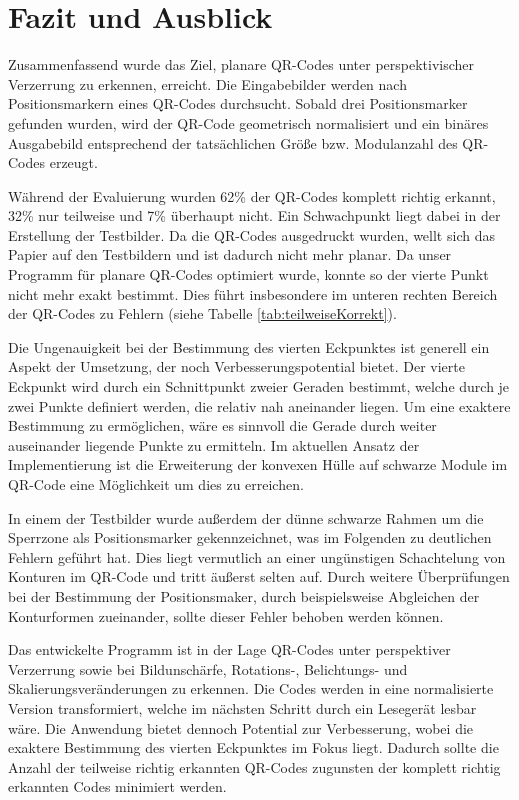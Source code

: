 \documentclass[a4paper, oneside, 12pt]{article}
\begin{document}
\newpage
\section{Fazit und Ausblick}
Zusammenfassend wurde das Ziel, planare QR-Codes unter perspektivischer Verzerrung zu erkennen, erreicht. Die Eingabebilder werden nach Positionsmarkern eines QR-Codes durchsucht. Sobald drei Positionsmarker gefunden wurden, wird der QR-Code geometrisch normalisiert und ein binäres Ausgabebild entsprechend der tatsächlichen Größe bzw. Modulanzahl des QR-Codes erzeugt.

Während der Evaluierung wurden 62\% der QR-Codes komplett richtig erkannt, 32\% nur teilweise und 7\% überhaupt nicht. Ein Schwachpunkt liegt dabei in der Erstellung der Testbilder. Da die QR-Codes ausgedruckt wurden, wellt sich das Papier auf den Testbildern und ist dadurch nicht mehr planar. Da unser Programm für planare QR-Codes optimiert wurde, konnte so der vierte Punkt nicht mehr exakt bestimmt. Dies führt insbesondere im unteren rechten Bereich der QR-Codes zu Fehlern (siehe Tabelle \ref{tab:teilweiseKorrekt}). 

Die Ungenauigkeit bei der Bestimmung des vierten Eckpunktes ist generell ein Aspekt der Umsetzung, der noch Verbesserungspotential bietet. Der vierte Eckpunkt wird durch ein Schnittpunkt zweier Geraden bestimmt, welche durch je zwei Punkte definiert werden, die relativ nah aneinander liegen. Um eine exaktere Bestimmung zu ermöglichen, wäre es sinnvoll die Gerade durch weiter auseinander liegende Punkte zu ermitteln. Im aktuellen Ansatz der Implementierung ist die Erweiterung der konvexen Hülle auf schwarze Module im QR-Code eine Möglichkeit um dies zu erreichen.

In einem der Testbilder wurde außerdem der dünne schwarze Rahmen um die Sperrzone als Positionsmarker gekennzeichnet, was im Folgenden zu deutlichen Fehlern geführt hat. Dies liegt vermutlich an einer ungünstigen Schachtelung von Konturen im QR-Code und tritt äußerst selten auf. Durch weitere Überprüfungen bei der Bestimmung der Positionsmaker, durch beispielsweise Abgleichen der Konturformen zueinander, sollte dieser Fehler behoben werden können.

Das entwickelte Programm ist in der Lage QR-Codes unter perspektiver Verzerrung sowie bei Bildunschärfe, Rotations-, Belichtungs- und Skalierungsveränderungen zu erkennen. Die Codes werden in eine normalisierte Version transformiert, welche im nächsten Schritt durch ein Lesegerät lesbar wäre. Die Anwendung bietet dennoch Potential zur Verbesserung, wobei die exaktere Bestimmung des vierten Eckpunktes im Fokus liegt. Dadurch sollte die Anzahl der teilweise richtig erkannten QR-Codes zugunsten der komplett richtig erkannten Codes minimiert werden.


\newpage

\nocite{*}


\end{document}
